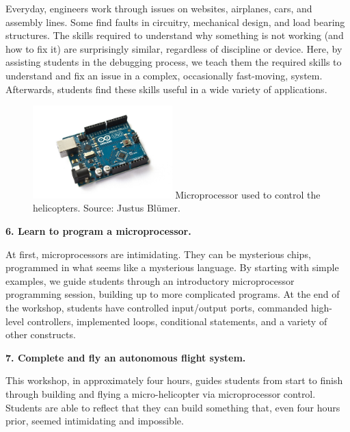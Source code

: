 \documentclass[11pt]{article}
\begin{document}
Everyday, engineers work through issues on websites, airplanes, cars, and assembly lines.  Some find faults in circuitry, mechanical design, and load bearing structures.  The skills required to understand why something is not working (and how to fix it) are surprisingly similar, regardless of discipline or device.  Here, by assisting students in the debugging process, we teach them the required skills to understand and fix an issue in a complex, occasionally fast-moving, system.  Afterwards, students find these skills useful in a wide variety of applications.

\vspace{20pt}
\begin{figure}
    \begin{center}
    \includegraphics[width=0.48\textwidth]{figures/arduino_uno.jpg}
    {\small Microprocessor used to control the helicopters.  Source: Justus Bl\"umer.}
    \end{center}
    \vspace{-20pt}
\end{figure}
\textbf{6. Learn to program a microprocessor.}

At first, microprocessors are intimidating.  They can be mysterious chips, programmed in what seems like a mysterious language.  By starting with simple examples, we guide students through an introductory microprocessor programming session, building up to more complicated programs.  At the end of the workshop, students have controlled input/output ports, commanded high-level controllers, implemented loops, conditional statements, and a variety of other constructs. 

\vspace{20pt}
\textbf{7. Complete and fly an autonomous flight system.}

This workshop, in approximately four hours, guides students from start to finish through building and flying a micro-helicopter via microprocessor control.  Students are able to reflect that they can build something that, even four hours prior, seemed intimidating and impossible.
\end{document}
